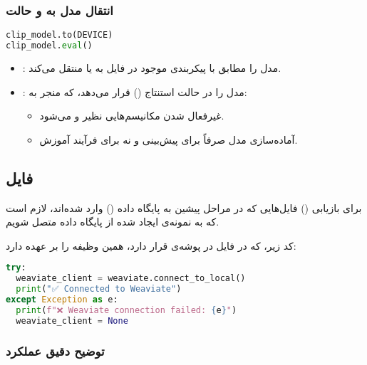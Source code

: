\documentclass{article}
\begin{document}
\subsubsection{انتقال مدل به  و حالت }

\begin{latin}
\begin{lstlisting}[language=Python]
clip_model.to(DEVICE)
clip_model.eval()
\end{lstlisting}
\end{latin}

\begin{itemize}
    \item {}: مدل را مطابق با پیکربندی موجود در فایل  به  یا  منتقل می‌کند.
    \item {}: مدل را در حالت استنتاج () قرار می‌دهد، که منجر به:
    \begin{itemize}
        \item غیرفعال شدن مکانیسم‌هایی نظیر  و  می‌شود.
        \item آماده‌سازی مدل صرفاً برای پیش‌بینی و نه برای فرآیند آموزش.
    \end{itemize}
\end{itemize}


\subsection{فایل }

برای بازیابی () فایل‌هایی که در مراحل پیشین به پایگاه داده () وارد شده‌اند، لازم است که به نمونه‌ی ایجاد شده از پایگاه داده متصل شویم.

کد زیر، که در فایل  در پوشه‌ی  قرار دارد، همین وظیفه را بر عهده دارد:

\begin{latin}
\begin{lstlisting}[language=Python]
try:
  weaviate_client = weaviate.connect_to_local()
  print("✅ Connected to Weaviate")
except Exception as e:
  print(f"❌ Weaviate connection failed: {e}")
  weaviate_client = None
\end{lstlisting}
\end{latin}

\subsubsection{توضیح دقیق عملکرد}
\end{document}
